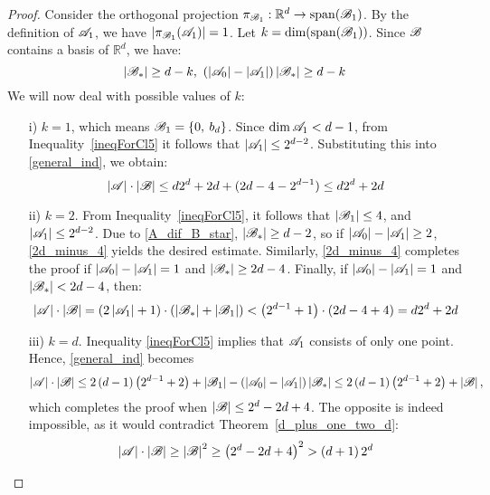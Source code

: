 \begin{proof}
        Consider the orthogonal projection $\pi_{{\mathscr{B}}_1}:\mathbb{R}^d\rightarrow\operatorname{span}({\mathscr{B}}_1)$. By the definition of ${\mathscr{A}}_1$, we have $\left|\pi_{{\mathscr{B}}_1}({\mathscr{A}}_1)\right|=1$. Let $k=\operatorname{dim(\operatorname{span}({\mathscr{B}}_1))}$. Since ${\mathscr{B}}$ contains a basis of $\mathbb{R}^d$, we have:
        \begin{equation}\label{A_dif_B_star}
            \left|\bb_*\right|\geq d-k ,\ 
            \left(\left|\aaa_0\right|-\left|\aaa_1\right|\right)\left|\bb_*\right| \geq d-k
        \end{equation}
        We will now deal with possible values of $k$:
        \begin{enumerate}
            \item[i)] $k=1$, which means ${\mathscr{B}}_1=\{0,\:b_d\}$. Since $\operatorname{dim}{\mathscr{A}}_1<d-1$, from Inequality~\ref{ineqForCl5} it follows that $\left|{\mathscr{A}}_1\right|\leq2^{d-2}$. Substituting this into \eqref{general_ind}, we obtain:
            \begin{equation*}
                \left|{\mathscr{A}}\right|\cdot\left|{\mathscr{B}}\right|\leq d 2^d + 2d + (2d - 4 - 2^{d-1}) \leq d 2^d + 2d
            \end{equation*}
            \item[ii)] $k=2$. From Inequality~\ref{ineqForCl5}, it follows that $\left|{\mathscr{B}}_1\right|\leq4$, and $\left|{\mathscr{A}}_1\right|\leq2^{d-2}$. Due to \eqref{A_dif_B_star}, $\left|{\mathscr{B}}_*\right|\geq d-2$, so if $\left|{\mathscr{A}}_0\right|-\left|{\mathscr{A}}_1\right|\geq 2$, \eqref{2d_minus_4} yields the desired estimate. Similarly, \eqref{2d_minus_4} completes the proof if $\left|{\mathscr{A}}_0\right|-\left|{\mathscr{A}}_1\right|=1$ and $\left|{\mathscr{B}}_*\right|\geq 2d-4$. Finally, if $\left|{\mathscr{A}}_0\right|-\left|{\mathscr{A}}_1\right|=1$ and $\left|{\mathscr{B}}_*\right|<2d-4$, then:
            \begin{equation*}
                \left|{\mathscr{A}}\right|\cdot\left|{\mathscr{B}}\right|=\left(2\left|{\mathscr{A}}_1\right|+1\right)\cdot\left(\left|{\mathscr{B}}_*\right|+\left|{\mathscr{B}}_1\right|\right)<\left(2^{d-1}+1\right)\cdot\left(2d-4+4\right)=d 2^d + 2d
            \end{equation*}
            \item[iii)] $k=d$. Inequality \ref{ineqForCl5} implies that ${\mathscr{A}}_1$ consists of only one point. Hence, \eqref{general_ind} becomes
            \begin{equation*}
                \left|{\mathscr{A}}\right|\cdot\left|{\mathscr{B}}\right|\leq 2\left(d-1\right)\left(2^{d-1}+2\right)+\left|{\mathscr{B}}_1\right|-\left(\left|{\mathscr{A}}_0\right|-\left|{\mathscr{A}}_1\right|\right)\left|{\mathscr{B}}_*\right| \leq 2\left(d-1\right)\left(2^{d-1}+2\right)+\left|{\mathscr{B}}\right|,
            \end{equation*}
            which completes the proof when $|{\mathscr{B}}| \leq 2^d-2d+4$. The opposite is indeed impossible, as it would contradict Theorem~\ref{d_plus_one_two_d}:
            \begin{equation*}
                \left|{\mathscr{A}}\right|\cdot\left|{\mathscr{B}}\right|\geq\left|{\mathscr{B}}\right|^2\geq\left(2^d-2d+4\right)^2>\left(d+1\right)2^d
            \end{equation*}
        \end{enumerate}


\end{proof}
